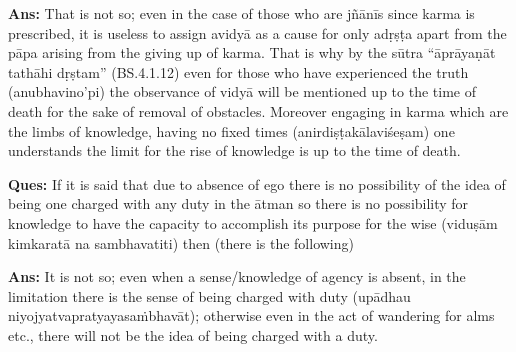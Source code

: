 \textbf{Ans:} That is not so; even in the case of those who are jñānīs since karma is prescribed, it is useless to assign avidyā as a cause for only adṛṣṭa apart from the pāpa arising from the giving up of karma. That is why by the sūtra “āprāyaṇāt tathāhi dṛṣtam” (BS.4.1.12) even for those who have experienced the truth (anubhavino’pi) the observance of vidyā will be mentioned up to the time of death for the sake of removal of obstacles. Moreover engaging in karma which are the limbs of knowledge, having no fixed times (anirdiṣṭakālaviśeṣam) one understands the limit for the rise of knowledge is up to the time of death. 



\textbf{Ques:} If it is said that due to absence of ego there is no possibility of the idea of being one charged with any duty in the ātman so there is no possibility for knowledge  to have the capacity to accomplish its purpose for the wise (viduṣām kimkaratā na sambhavatiti) then (there is the following)

\textbf{Ans:} It is not so; even when a sense/knowledge of agency is absent,  in the limitation there is the sense of being charged with duty (upādhau niyojyatvapratyayasaṁbhavāt); otherwise even in the act of wandering for alms etc., there will not be the idea of being charged with a duty.

